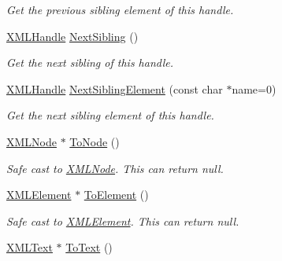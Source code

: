 \begin{DoxyCompactItemize}
\begin{DoxyCompactList}\small\item\em Get the previous sibling element of this handle. \end{DoxyCompactList}\item 
\hyperlink{classtinyxml2_1_1XMLHandle}{X\+M\+L\+Handle} \hyperlink{classtinyxml2_1_1XMLHandle_aad2eccc7c7c7b18145877c978c3850b5}{Next\+Sibling} ()\hypertarget{classtinyxml2_1_1XMLHandle_aad2eccc7c7c7b18145877c978c3850b5}{}\label{classtinyxml2_1_1XMLHandle_aad2eccc7c7c7b18145877c978c3850b5}

\begin{DoxyCompactList}\small\item\em Get the next sibling of this handle. \end{DoxyCompactList}\item 
\hyperlink{classtinyxml2_1_1XMLHandle}{X\+M\+L\+Handle} \hyperlink{classtinyxml2_1_1XMLHandle_ae41d88ee061f3c49a081630ff753b2c5}{Next\+Sibling\+Element} (const char $\ast$name=0)\hypertarget{classtinyxml2_1_1XMLHandle_ae41d88ee061f3c49a081630ff753b2c5}{}\label{classtinyxml2_1_1XMLHandle_ae41d88ee061f3c49a081630ff753b2c5}

\begin{DoxyCompactList}\small\item\em Get the next sibling element of this handle. \end{DoxyCompactList}\item 
\hyperlink{classtinyxml2_1_1XMLNode}{X\+M\+L\+Node} $\ast$ \hyperlink{classtinyxml2_1_1XMLHandle_a03ea6ec970a021b71bf1219a0f6717df}{To\+Node} ()\hypertarget{classtinyxml2_1_1XMLHandle_a03ea6ec970a021b71bf1219a0f6717df}{}\label{classtinyxml2_1_1XMLHandle_a03ea6ec970a021b71bf1219a0f6717df}

\begin{DoxyCompactList}\small\item\em Safe cast to \hyperlink{classtinyxml2_1_1XMLNode}{X\+M\+L\+Node}. This can return null. \end{DoxyCompactList}\item 
\hyperlink{classtinyxml2_1_1XMLElement}{X\+M\+L\+Element} $\ast$ \hyperlink{classtinyxml2_1_1XMLHandle_a5e73ed8f3f6f9619d5a8bb1862c47d99}{To\+Element} ()\hypertarget{classtinyxml2_1_1XMLHandle_a5e73ed8f3f6f9619d5a8bb1862c47d99}{}\label{classtinyxml2_1_1XMLHandle_a5e73ed8f3f6f9619d5a8bb1862c47d99}

\begin{DoxyCompactList}\small\item\em Safe cast to \hyperlink{classtinyxml2_1_1XMLElement}{X\+M\+L\+Element}. This can return null. \end{DoxyCompactList}\item 
\hyperlink{classtinyxml2_1_1XMLText}{X\+M\+L\+Text} $\ast$ \hyperlink{classtinyxml2_1_1XMLHandle_a6ab9e8cbfb41417246e5657e3842c62a}{To\+Text} ()\hypertarget{classtinyxml2_1_1XMLHandle_a6ab9e8cbfb41417246e5657e3842c62a}{}\label{classtinyxml2_1_1XMLHandle_a6ab9e8cbfb41417246e5657e3842c62a}


\end{DoxyCompactItemize}
